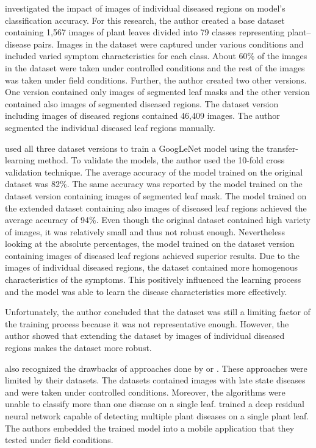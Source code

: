 \documentclass{BachelorBUI}
\begin{document}
        \textcite{Barbedo:2019} investigated the impact of images of individual diseased regions on model's classification accuracy. For this research, the author created a base dataset containing 1,567 images of plant leaves divided into 79 classes representing plant--disease pairs. Images in the dataset were captured under various conditions and included varied symptom characteristics for each class. About 60\% of the images in the dataset were taken under controlled conditions and the rest of the images was taken under field conditions. Further, the author created two other versions. One version contained only images of segmented leaf masks and the other version contained also images of segmented diseased regions. The dataset version including images of diseased regions contained 46,409 images. The author segmented the individual diseased leaf regions manually.

        \textcite{Barbedo:2019} used all three dataset versions to train a GoogLeNet model using the transfer-learning method. To validate the models, the author used the 10-fold cross validation technique. The average accuracy of the model trained on the original dataset was 82\%. The same accuracy was reported by the model trained on the dataset version containing images of segmented leaf mask. The model trained on the extended dataset containing also images of diseased leaf regions achieved the average accuracy of 94\%. Even though the original dataset contained high variety of images, it was relatively small and thus not robust enough. Nevertheless looking at the absolute percentages, the model trained on the dataset version containing images of diseased leaf regions achieved superior results. Due to the images of individual diseased regions, the dataset contained more homogenous characteristics of the symptoms. This positively influenced the learning process and the model was able to learn the disease characteristics more effectively.

        Unfortunately, the author concluded that the dataset was still a limiting factor of the training process because it was not representative enough. However, the author showed that extending the dataset by images of individual diseased regions makes the dataset more robust.
        
        \textcite{Picon:2019} also recognized the drawbacks of approaches done by \textcite{Mohanty:2016} or \textcite{Sladojevic:2016}. These approaches were limited by their datasets. The datasets contained images with late state diseases and were taken under controlled conditions. Moreover, the algorithms were unable to classify more than one disease on a single leaf. \textcite{Picon:2019} trained a deep residual neural network capable of detecting multiple plant diseases on a single plant leaf. The authors embedded the trained model into a mobile application that they tested under field conditions. 
\end{document}
